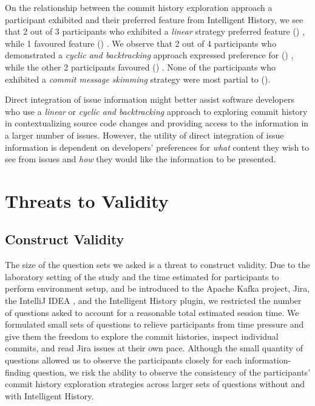 On the relationship between the commit history exploration approach 
a participant exhibited and their preferred feature from Intelligent History,
we see that 2 out of 3 participants who exhibited a \textit{linear} strategy preferred feature () ,
while 1 favoured feature () .
We observe that 2 out of 4 participants who demonstrated a \textit{cyclic and backtracking} 
approach expressed preference for () ,
while the other 2 participants favoured () .
None of the participants who exhibited a \textit{commit message skimming} strategy 
were most partial to ().

\pagebreak
\begin{summary}[RQ3]
  Direct integration of issue information might better assist software developers 
  who use a \textit{linear} or \textit{cyclic and backtracking} approach to exploring commit history 
  in contextualizing source code changes and providing access to the information in a larger number of issues.
  However, the utility of direct integration of issue information is dependent on developers' preferences 
  for \emph{what} content they wish to see from issues and \emph{how} they would like 
  the information to be presented.
\end{summary}


\section{Threats to Validity}

\subsection{Construct Validity}

The size of the question sets we asked is a threat to construct validity.
Due to the laboratory setting of the study and the time estimated for participants to perform environment setup,
and be introduced to the Apache Kafka project, Jira, the IntelliJ IDEA , and the Intelligent History plugin,
we restricted the number of questions asked to account for a reasonable total estimated session time.
We formulated small sets of questions to relieve participants from time pressure 
and give them the freedom to explore the commit histories, inspect individual commits, and read Jira issues at their own pace.
Although the small quantity of questions allowed us to observe the participants closely for each information-finding question,
we risk the ability to observe the consistency of the participants' commit history exploration strategies
across larger sets of questions without and with Intelligent History.

